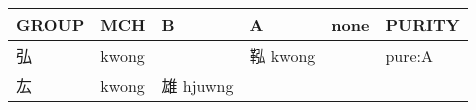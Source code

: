 \documentclass[14pt,a4paper]{scrartcl}
\begin{document}
\begin{longtable}[c]{@{}llllll@{}}
\toprule
\begin{minipage}[b]{0.14\columnwidth}\raggedright\strut
GROUP
\strut\end{minipage} &
\begin{minipage}[b]{0.14\columnwidth}\raggedright\strut
MCH
\strut\end{minipage} &
\begin{minipage}[b]{0.14\columnwidth}\raggedright\strut
B
\strut\end{minipage} &
\begin{minipage}[b]{0.14\columnwidth}\raggedright\strut
A
\strut\end{minipage} &
\begin{minipage}[b]{0.14\columnwidth}\raggedright\strut
none
\strut\end{minipage} &
\begin{minipage}[b]{0.14\columnwidth}\raggedright\strut
PURITY
\strut\end{minipage}\tabularnewline
\midrule
\endhead
\begin{minipage}[t]{0.14\columnwidth}\raggedright\strut
弘
\strut\end{minipage} &
\begin{minipage}[t]{0.14\columnwidth}\raggedright\strut
kwong
\strut\end{minipage} &
\begin{minipage}[t]{0.14\columnwidth}\raggedright\strut
\strut\end{minipage} &
\begin{minipage}[t]{0.14\columnwidth}\raggedright\strut
鞃 kwong
\strut\end{minipage} &
\begin{minipage}[t]{0.14\columnwidth}\raggedright\strut
\strut\end{minipage} &
\begin{minipage}[t]{0.14\columnwidth}\raggedright\strut
pure:A
\strut\end{minipage}\tabularnewline
\begin{minipage}[t]{0.14\columnwidth}\raggedright\strut
厷
\strut\end{minipage} &
\begin{minipage}[t]{0.14\columnwidth}\raggedright\strut
kwong
\strut\end{minipage} &
\begin{minipage}[t]{0.14\columnwidth}\raggedright\strut
雄 hjuwng
\strut\end{minipage} &
\begin{minipage}[t]{0.14\columnwidth}\raggedright\strut

\end{minipage}
\end{longtable}
\end{document}
